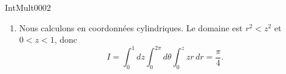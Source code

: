 \begin{corrige}{IntMult0002}
\begin{enumerate}
\item
Nous calculons en coordonnées cylindriques. Le domaine est $r^2<z^2$ et $0<z<1$, donc
\begin{equation}
	I=\int_0^1dz\int_0^{2\pi}d\theta\int_0^z zr\,dr=\frac{ \pi }{ 4 }.
\end{equation}


\end{enumerate}


\end{corrige}
